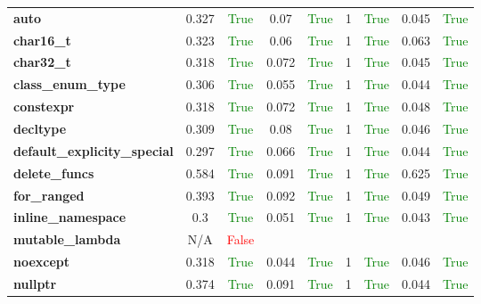 \documentclass{article}
\begin{document}
\begin{xltabular}{\textwidth}{lcccccccc}
\textbf{{\fontsize{10}{12}\selectfont auto}}& 0.327&\textcolor{green}{True}& 0.07&\textcolor{green}{True}& 1&\textcolor{green}{True}& 0.045&\textcolor{green}{True} \\[0.5ex]
\textbf{{\fontsize{10}{12}\selectfont char16\_t}}& 0.323&\textcolor{green}{True}& 0.06&\textcolor{green}{True}& 1&\textcolor{green}{True}& 0.063&\textcolor{green}{True} \\[0.5ex]
\textbf{{\fontsize{10}{12}\selectfont char32\_t}}& 0.318&\textcolor{green}{True}& 0.072&\textcolor{green}{True}& 1&\textcolor{green}{True}& 0.045&\textcolor{green}{True} \\[0.5ex]
\textbf{{\fontsize{10}{12}\selectfont class\_enum\_type}}& 0.306&\textcolor{green}{True}& 0.055&\textcolor{green}{True}& 1&\textcolor{green}{True}& 0.044&\textcolor{green}{True} \\[0.5ex]
\textbf{{\fontsize{10}{12}\selectfont constexpr}}& 0.318&\textcolor{green}{True}& 0.072&\textcolor{green}{True}& 1&\textcolor{green}{True}& 0.048&\textcolor{green}{True} \\[0.5ex]
\textbf{{\fontsize{10}{12}\selectfont decltype}}& 0.309&\textcolor{green}{True}& 0.08&\textcolor{green}{True}& 1&\textcolor{green}{True}& 0.046&\textcolor{green}{True} \\[0.5ex]
\textbf{{\fontsize{10}{12}\selectfont default\_explicity\_special}}& 0.297&\textcolor{green}{True}& 0.066&\textcolor{green}{True}& 1&\textcolor{green}{True}& 0.044&\textcolor{green}{True} \\[0.5ex]
\textbf{{\fontsize{10}{12}\selectfont delete\_funcs}}& 0.584&\textcolor{green}{True}& 0.091&\textcolor{green}{True}& 1&\textcolor{green}{True}& 0.625&\textcolor{green}{True} \\[0.5ex]
\textbf{{\fontsize{10}{12}\selectfont for\_ranged}}& 0.393&\textcolor{green}{True}& 0.092&\textcolor{green}{True}& 1&\textcolor{green}{True}& 0.049&\textcolor{green}{True} \\[0.5ex]
\textbf{{\fontsize{10}{12}\selectfont inline\_namespace}}& 0.3&\textcolor{green}{True}& 0.051&\textcolor{green}{True}& 1&\textcolor{green}{True}& 0.043&\textcolor{green}{True} \\[0.5ex]
\textbf{{\fontsize{10}{12}\selectfont mutable\_lambda}}& N/A&\textcolor{red}{False} \\[0.5ex]
\textbf{{\fontsize{10}{12}\selectfont noexcept}}& 0.318&\textcolor{green}{True}& 0.044&\textcolor{green}{True}& 1&\textcolor{green}{True}& 0.046&\textcolor{green}{True} \\[0.5ex]
\textbf{{\fontsize{10}{12}\selectfont nullptr}}& 0.374&\textcolor{green}{True}& 0.091&\textcolor{green}{True}& 1&\textcolor{green}{True}& 0.044&\textcolor{green}{True} \\[0.5ex]

\end{xltabular}
\end{document}
